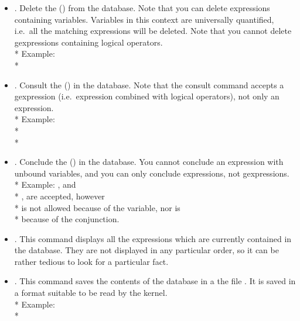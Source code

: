\begin{itemize}

\item {}. Delete the 
() from the database. Note that you can delete
expressions containing variables. Variables in this context are universally
quantified, i.e.\ all the matching expressions will be deleted. Note that you
cannot delete gexpressions containing logical operators.\\*
Example: \\*

\item {}. Consult the 
() in the database. Note that the consult
command accepts a gexpression (i.e.\ expression combined with logical
operators), not only an expression.\\*
Example: \\*
\\*

\item {}. Conclude the 
() in the database. You cannot conclude an
expression with unbound variables, and you can only conclude expressions, not
gexpressions.\\*
Example: , and\\*
, are accepted, however\\*
 is not allowed because of the variable, nor is\\*
 because of the conjunction.


\item {}. This command displays all the expressions which
are currently contained in the database. They are not displayed in any
particular order, so it can be rather tedious to look for a particular fact.

\item {}. This command saves the contents of the
database in a the file . It is saved in a format suitable to be
read by the kernel. \\*
Example: \\*


\end{itemize}
